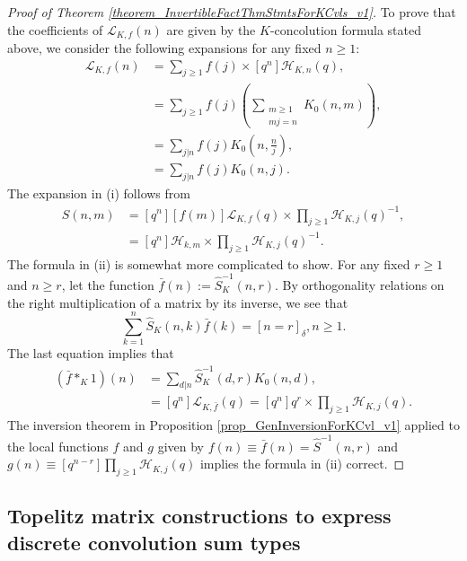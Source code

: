 \documentclass[12pt,reqno,a4letter]{article}
\numberwithin{figure}{section}
\numberwithin{table}{section}
\numberwithin{equation}{section}
\newcommand{\Iverson}[1]{\ensuremath{\left[#1\right]_{\delta}}}
\theoremstyle{plain}
\numberwithin{theorem}{section}
\theoremstyle{definition}
\begin{document}
\begin{proof}[Proof of Theorem \ref{theorem_InvertibleFactThmStmtsForKCvls_v1}] 
To prove that the coefficients of $\mathcal{L}_{K,f}(n)$ are given by the $K$-concolution formula 
stated above, we consider the following expansions for any fixed $n \geq 1$: 
\begin{align*}
[q^n] \mathcal{L}_{K,f}(n) & = \sum_{j \geq 1} f(j) \times [q^n] \mathcal{H}_{K,n}(q), \\ 
     & = \sum_{j \geq 1} f(j) \left(\sum_{\substack{m \geq 1 \\ mj=n}} K_0(n, m)\right), \\ 
     & = \sum_{j|n} f(j) K_0\left(n, \frac{n}{j}\right), \\ 
     & = \sum_{j|n} f(j) K_0(n, j). 
\end{align*} 
The expansion in (i) follows from 
\begin{align*}
\hat{S}(n, m) & = [q^n][f(m)] \mathcal{L}_{K,f}(q) \times \prod_{j \geq 1} \mathcal{H}_{K,j}(q)^{-1}, \\ 
     & = [q^n] \mathcal{H}_{k,m} \times \prod_{j \geq 1} \mathcal{H}_{K,j}(q)^{-1}. 
\end{align*} 
The formula in (ii) is somewhat more complicated to show. For any fixed $r \geq 1$ and $n \geq r$, 
let the function $\bar{f}(n) := \hat{S}^{-1}_K(n, r)$. 
By orthogonality relations on the right multiplication of a matrix by its inverse, we see that 
\[
\sum_{k=1}^{n} \hat{S}_K(n, k) \bar{f}(k) = \Iverson{n = r}, n \geq 1. 
\]
The last equation implies that 
\begin{align*} 
(\bar{f} \ast_{K} 1)(n) & = \sum_{d|n} \hat{S}^{-1}_K(d, r) K_0(n, d), \\ 
     & = [q^n] \mathcal{L}_{K,\bar{f}}(q) 
     = [q^n] q^r \times \prod_{j \geq 1} \mathcal{H}_{K,j}(q). 
\end{align*} 
The inversion theorem in Proposition \ref{prop_GenInversionForKCvl_v1} 
applied to the local functions $f$ and $g$ given by 
$f(n) \equiv \bar{f}(n) = \hat{S}^{-1}(n, r)$ and $g(n) \equiv [q^{n-r}] \prod_{j \geq 1} \mathcal{H}_{K,j}(q)$ 
implies the formula in (ii) correct. 
\end{proof}

\subsection{Topelitz matrix constructions to express discrete convolution sum types}

\nocite{MATRIX-COOKBOOK,TOPELITZ-GRAY}
\end{document}
